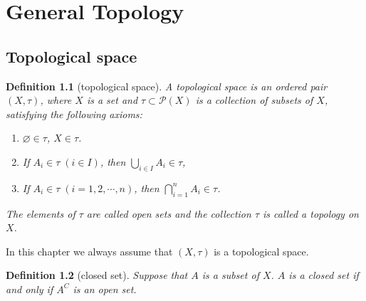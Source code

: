 \documentclass{report}
\newtheorem{definition}{Definition}[section]
\theoremstyle{nonumberplain}
\begin{document}
\chapter{General Topology}
\section{Topological space}

\begin{definition}[topological space]
	A \emph{topological space} is an ordered pair $(X,\tau)$, where $X$ is a set and $\tau\subset\mathcal{P}(X)$ is a collection of subsets of $X$, satisfying the following axioms:
	\begin{enumerate}	
		\item $\varnothing\in \tau$, $X\in \tau$.	
		\item If $A_i\in\tau\;(i\in I)$, then $\bigcup\limits_{i\in I}A_i\in \tau$, 
		\item If $A_i\in\tau\;(i=1,2,\cdots,n)$, then $\bigcap\limits_{i=1}^nA_i\in \tau$.
	\end{enumerate}
\noindent The elements of $\tau$ are called \emph{open sets} and the collection $\tau$ is called a \emph{topology} on $X$.
\end{definition}
	
\noindent In this chapter we always assume that $(X,\tau)$ is a topological space.


\begin{definition}[closed set]
	Suppose that $A$ is a subset of $X$. $A$ is a \emph{closed set} if and only if $A^C$ is an open set.
\end{definition}
\end{document}
